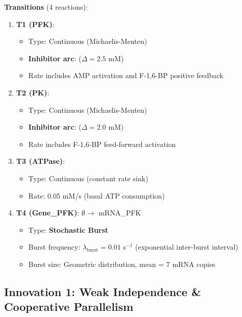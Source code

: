 \textbf{Transitions} (4 reactions):

\begin{enumerate}
    \item \textbf{T1 (PFK)}: 
    \begin{itemize}
        \item Type: Continuous (Michaelis-Menten)
        \item \textbf{Inhibitor arc}:  ($\Delta = 2.5$ mM)
        \item Rate includes AMP activation and F-1,6-BP positive feedback
    \end{itemize}
    
    \item \textbf{T2 (PK)}: 
    \begin{itemize}
        \item Type: Continuous (Michaelis-Menten)
        \item \textbf{Inhibitor arc}:  ($\Delta = 2.0$ mM)
        \item Rate includes F-1,6-BP feed-forward activation
    \end{itemize}
    
    \item \textbf{T3 (ATPase)}: 
    \begin{itemize}
        \item Type: Continuous (constant rate sink)
        \item Rate: 0.05 mM/s (basal ATP consumption)
    \end{itemize}
    
    \item \textbf{T4 (Gene\_PFK)}: $\emptyset \to$ mRNA\_PFK
    \begin{itemize}
        \item Type: \textbf{Stochastic Burst}
        \item Burst frequency: $\lambda_{\text{burst}} = 0.01$ s$^{-1}$ (exponential inter-burst interval)
        \item Burst size: Geometric distribution, mean = 7 mRNA copies
    \end{itemize}
\end{enumerate}

\subsection{Innovation 1: Weak Independence \& Cooperative Parallelism}
\label{subsec:energy-weak-indep}

